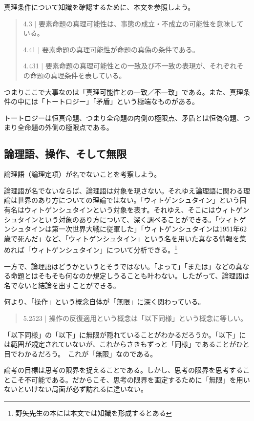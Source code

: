 \documentclass[a4paper,onecolumn,openany,article]{jsarticle}
\begin{document}
真理条件について知識を確認するために、本文を参照しよう。

\begin{quote}
  4.3 | 要素命題の真理可能性は、事態の成立・不成立の可能性を意味している。
  
  4.41 | 要素命題の真理可能性が命題の真偽の条件である。
  
  4.431 | 要素命題の真理可能性との一致及び不一致の表現が、それぞれその命題の真理条件を表している。
\end{quote}

つまりここで大事なのは「真理可能性との一致／不一致」である。また、真理条件の中には「トートロジー」「矛盾」という極端なものがある。

トートロジーは恒真命題、つまり全命題の内側の極限点、矛盾とは恒偽命題、つまり全命題の外側の極限点である。

\subsection{論理語、操作、そして無限}

論理語（論理定項）が名でないことを考察しよう。

論理語が名でないならば、論理語は対象を現さない。それゆえ論理語に関わる理論は世界のあり方についての理論ではない。「ウィトゲンシュタイン」という固有名はウィトゲンシュタインという対象を表す。それゆえ、そこにはウィトゲンシュタインという対象のあり方について、深く調べることができる。「ウィトゲンシュタインは第一次世界大戦に従軍した」「ウィトゲンシュタインは1951年62歳で死んだ」など、「ウィトゲンシュタイン」という名を用いた真なる情報を集めれば「ウィトゲンシュタイン」について分析できる。\footnote{野矢先生の本には本文では知識を形成するとある}

一方で、論理語はどうかというとそうではない。「よって」「または」などの真なる命題とはそもそも何なのか規定しうることも叶わない。したがって、論理語は名でないと結論を出すことができる。

何より、「操作」という概念自体が「無限」に深く関わっている。

\begin{quote}
  5.2523 | 操作の反復適用という概念は「以下同様」という概念に等しい。
\end{quote}

「以下同様」の「以下」に無限が隠れていることがわかるだろうか。「以下」には範囲が規定されていないが、これからさきもずっと「同様」であることがひと目でわかるだろう。 これが「無限」なのである。

論考の目標は思考の限界を捉えることである。しかし、思考の限界を思考することこそ不可能である。だからこそ、思考の限界を画定するために「無限」を用いないといけない局面が必ず訪れるに違いない。
\end{document}
